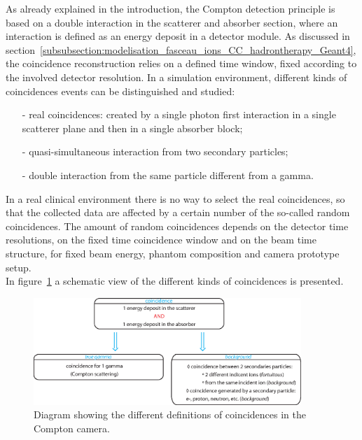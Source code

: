 As already explained in the introduction, the Compton detection principle is based on a double interaction in the scatterer and absorber section, where an interaction is defined as an energy deposit in a detector module. As discussed in section~\ref{subsubsection:modelisation_fasceau_ions_CC_hadrontherapy_Geant4}, the coincidence reconstruction relies on a defined time window, fixed according to the involved detector resolution. In a simulation environment, different kinds of coincidences events can be distinguished and studied: 
\begin{itemize}
\item[-] real coincidences: created by a single photon first interaction in a single scatterer plane and then in a single absorber block;
\item[-] quasi-simultaneous interaction from two secondary particles;
\item[-] double interaction from the same particle different from a gamma.
\end{itemize}
In a real clinical environment there is no way to select the real coincidences, so that the collected data are affected by a certain number of the so-called random coincidences. The amount of random coincidences depends on the detector time resolutions, on the fixed time coincidence window and on the beam time structure, for fixed beam energy, phantom composition and camera prototype setup.\\

In figure~\ref{fig:fig_explication_coincidence_CC_simulation_Hadronth} a schematic view of the different kinds of coincidences is presented.
	\begin{figure} [!hbtp]	
	\centering
	\includegraphics[width=0.9\textwidth]{./Figure/Schema_coincidence_EN.eps}
	\caption{Diagram showing the different definitions of coincidences in the Compton camera.}
	 \label{fig:fig_explication_coincidence_CC_simulation_Hadronth}
	\end{figure}

